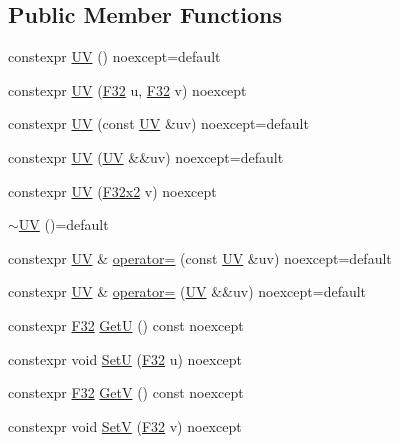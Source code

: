 \subsection*{Public Member Functions}
\begin{DoxyCompactItemize}
\item 
constexpr \mbox{\hyperlink{structmage_1_1_u_v_adc1ec1943378b391e1eeba840070b62c}{UV}} () noexcept=default
\item 
constexpr \mbox{\hyperlink{structmage_1_1_u_v_a383d9dff35f65343ea90284a07581b1f}{UV}} (\mbox{\hyperlink{namespacemage_aa97e833b45f06d60a0a9c4fc22ae02c0}{F32}} u, \mbox{\hyperlink{namespacemage_aa97e833b45f06d60a0a9c4fc22ae02c0}{F32}} v) noexcept
\item 
constexpr \mbox{\hyperlink{structmage_1_1_u_v_a2756ef5aa4b99bd8d8bce4b43c205e30}{UV}} (const \mbox{\hyperlink{structmage_1_1_u_v}{UV}} \&uv) noexcept=default
\item 
constexpr \mbox{\hyperlink{structmage_1_1_u_v_aea441530786bac9c6eb02bff653834bd}{UV}} (\mbox{\hyperlink{structmage_1_1_u_v}{UV}} \&\&uv) noexcept=default
\item 
constexpr \mbox{\hyperlink{structmage_1_1_u_v_ab5b287a94fef45b70f7c6d50ede33bff}{UV}} (\mbox{\hyperlink{namespacemage_a9dc0d34d6ecc87e4cfa4a826102117bc}{F32x2}} v) noexcept
\item 
\mbox{\hyperlink{structmage_1_1_u_v_a9389be8cc9bb64861b69f79b44b6dd1b}{$\sim$\+UV}} ()=default
\item 
constexpr \mbox{\hyperlink{structmage_1_1_u_v}{UV}} \& \mbox{\hyperlink{structmage_1_1_u_v_a53bf93c8a9b97f07d2b7db5a7e22be51}{operator=}} (const \mbox{\hyperlink{structmage_1_1_u_v}{UV}} \&uv) noexcept=default
\item 
constexpr \mbox{\hyperlink{structmage_1_1_u_v}{UV}} \& \mbox{\hyperlink{structmage_1_1_u_v_a2737f10decab84904fbd16a3f213c470}{operator=}} (\mbox{\hyperlink{structmage_1_1_u_v}{UV}} \&\&uv) noexcept=default
\item 
constexpr \mbox{\hyperlink{namespacemage_aa97e833b45f06d60a0a9c4fc22ae02c0}{F32}} \mbox{\hyperlink{structmage_1_1_u_v_a8587903b07cab58428d01ed9ded97dd4}{GetU}} () const noexcept
\item 
constexpr void \mbox{\hyperlink{structmage_1_1_u_v_a0c7826aed81123c47129d552c696ab18}{SetU}} (\mbox{\hyperlink{namespacemage_aa97e833b45f06d60a0a9c4fc22ae02c0}{F32}} u) noexcept
\item 
constexpr \mbox{\hyperlink{namespacemage_aa97e833b45f06d60a0a9c4fc22ae02c0}{F32}} \mbox{\hyperlink{structmage_1_1_u_v_a95b38718cb3eeaacebdfa306b4921d90}{GetV}} () const noexcept
\item 
constexpr void \mbox{\hyperlink{structmage_1_1_u_v_aa76b301726c43197f6de07ff6fec71b2}{SetV}} (\mbox{\hyperlink{namespacemage_aa97e833b45f06d60a0a9c4fc22ae02c0}{F32}} v) noexcept
\end{DoxyCompactItemize}
